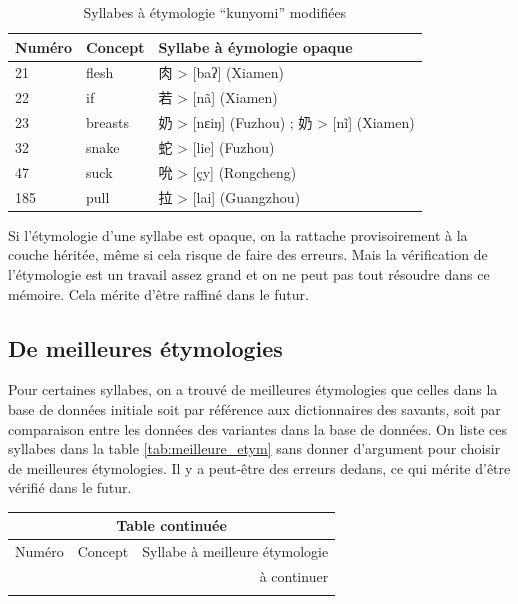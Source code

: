 \documentclass{scrbook}
\newcounter{c}[subsubsection]
\begin{document}
\begin{sloppypar}
\begin{table}[htbp]
  \centering

    \begin{tabular}{lll}
    \toprule
    Numéro & Concept & Syllabe à éymologie opaque \\
    \midrule
    21    & flesh & 肉 > [baʔ] (Xiamen) \\
    22    & if    & 若 > [nã] (Xiamen) \\
    23    & breasts & 奶 > [nɛiŋ] (Fuzhou) ; 奶 > [nĩ] (Xiamen) \\
    32    & snake & 蛇 > [lie] (Fuzhou) \\
    47    & suck  & 吮 > [çy] (Rongcheng)  \\
    185   & pull  & 拉 > [lai] (Guangzhou)  \\
    \bottomrule
    \end{tabular}%
  \caption{Syllabes à étymologie ``kunyomi'' modifiées}
  \label{tab:etym_opaque}%
\end{table}%

Si l'étymologie d'une syllabe est opaque, on la rattache provisoirement à la couche héritée, même si cela risque de faire des erreurs. Mais la vérification de l'étymologie est un travail assez grand et on ne peut pas tout résoudre dans ce mémoire. Cela mérite d'être raffiné dans le futur.

\subsection{De meilleures étymologies}
Pour certaines syllabes, on a trouvé de meilleures étymologies que celles dans la base de données initiale soit par référence aux dictionnaires des savants, soit par comparaison entre les données des variantes dans la base de données. On liste ces syllabes dans la table \ref{tab:meilleure_etym} sans donner d'argument pour choisir de meilleures étymologies. Il y a peut-être des erreurs dedans, ce qui mérite d'être vérifié dans le futur.

\begin{longtable}[htbp]{lll}
    \endfirsthead
	
	\multicolumn{3}{c}{Table continuée}\\
    \toprule
    Numéro & Concept & Syllabe à meilleure étymologie \\
    \hline
    \endhead

    \hline
    \multicolumn{3}{r}{à continuer} \\
    \endfoot
    \endlastfoot
    

\end{longtable}
\end{sloppypar}
\end{document}
